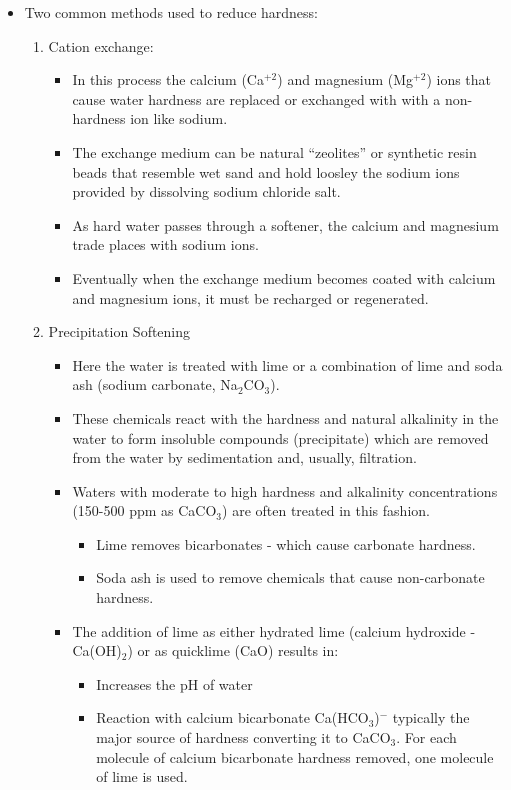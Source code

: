 \begin{itemize}
\item Two common methods used to reduce hardness:
\begin{enumerate}
\item Cation exchange:
\begin{itemize}
\item In this process the calcium (Ca$^{+2}$) and magnesium (Mg$^{+2}$) ions that cause water hardness are replaced or exchanged with with a non-hardness ion like sodium. 
\item The exchange medium can be natural “zeolites” or synthetic resin beads that resemble wet sand and hold loosley the sodium ions provided by dissolving sodium chloride salt.
\item As hard water passes through a softener, the calcium and magnesium trade places with sodium ions. 
\item Eventually when the exchange medium becomes coated with calcium and magnesium ions, it must be recharged or regenerated.
\end{itemize}
\item Precipitation Softening
\begin{itemize}
\item Here the water is treated with lime or a combination of lime and soda ash (sodium carbonate, Na$_2$CO$_3$). 
\item These chemicals react with the hardness and natural alkalinity in the water to form insoluble compounds (precipitate) which are removed from the water by sedimentation and, usually, filtration.
\item Waters with moderate to high hardness and alkalinity concentrations (150-500 ppm as CaCO$_3$) are often treated in this fashion.
\begin{itemize}
\item Lime removes bicarbonates - which cause carbonate hardness. 
\item Soda ash is used to remove chemicals that cause non-carbonate hardness.
\end{itemize}
\item The addition of lime as either hydrated lime (calcium hydroxide - Ca(OH)$_2$) or as quicklime (CaO) results in:
\begin{itemize}
\item Increases the pH of water
\item Reaction with calcium bicarbonate Ca(HCO$_3$)$^-$ typically the major source of hardness converting it to CaCO$_3$.  For each molecule of calcium bicarbonate hardness removed, one molecule of lime is used. 

\end{itemize}
\end{itemize}
\end{enumerate}
\end{itemize}
